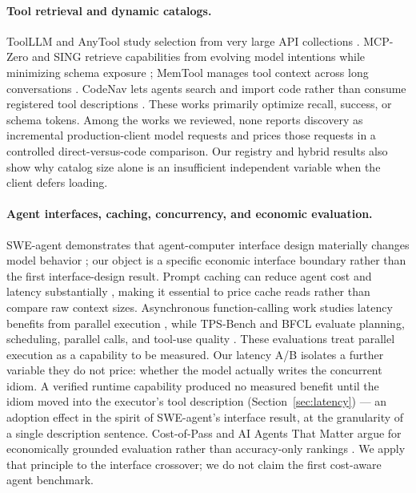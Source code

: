 \documentclass[10pt,twocolumn]{article}
\begin{document}
\paragraph{Tool retrieval and dynamic catalogs.}
ToolLLM and AnyTool study selection from very large API collections
\cite{qin2023toolllm,du2024anytool}.  MCP-Zero and SING retrieve capabilities
from evolving model intentions while minimizing schema exposure
\cite{fei2025mcpzero,xiao2026sing}; MemTool manages tool context across long
conversations \cite{lumer2025memtool}.  CodeNav lets agents search and import
code rather than consume registered tool descriptions
\cite{gupta2024codenav}.  These works primarily optimize recall, success, or
schema tokens.  Among the works we reviewed, none reports discovery as
incremental production-client model requests and prices those requests in a
controlled direct-versus-code comparison.  Our registry and hybrid results
also show why catalog size alone is an insufficient independent variable when
the client defers loading.

\paragraph{Agent interfaces, caching, concurrency, and economic evaluation.}
SWE-agent demonstrates that agent-computer interface design materially changes
model behavior \cite{yang2024sweagent}; our object is a specific economic
interface boundary rather than the first interface-design result.  Prompt
caching can reduce agent cost and latency substantially
\cite{lumer2026cache}, making it essential to price cache reads rather than
compare raw context sizes.  Asynchronous function-calling work studies latency
benefits from parallel execution \cite{gim2024asynclm}, while TPS-Bench and
BFCL evaluate planning, scheduling, parallel calls, and tool-use quality
\cite{xu2025tpsbench,patil2025bfcl}.  These evaluations treat parallel
execution as a capability to be measured.  Our latency A/B isolates a further
variable they do not price: whether the model actually writes the concurrent
idiom.  A verified runtime capability produced no measured benefit until the
idiom moved into the executor's tool description
(Section~\ref{sec:latency}) --- an adoption effect in the spirit of
SWE-agent's interface result, at the granularity of a single description
sentence.  Cost-of-Pass and AI Agents That Matter
argue for economically grounded evaluation rather than accuracy-only rankings
\cite{erol2026costofpass,kapoor2025agentsmatter}.  We apply that principle to
the interface crossover; we do not claim the first cost-aware agent benchmark.
\end{document}
